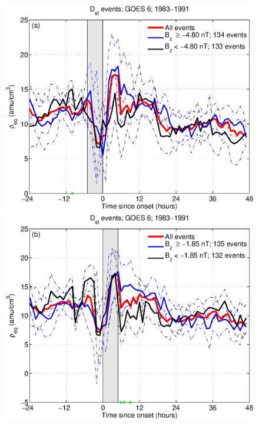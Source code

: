 \begin{figure}[tp!]
  \centering
  \includegraphics[scale=0.40]{2016SW001507R-p05a.eps}
  \includegraphics[scale=0.40]{2016SW001507R-p05b.eps}
\end{figure}
